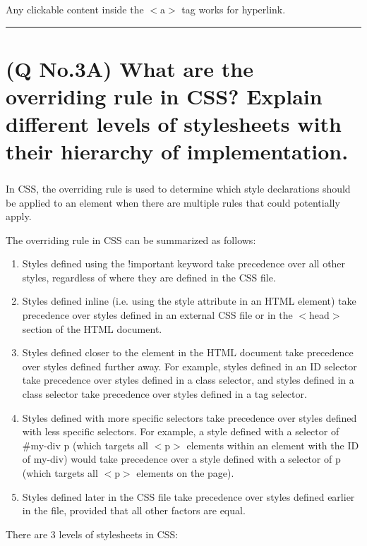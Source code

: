 \documentclass[11pt]{article}
\begin{document}
Any clickable content inside the $<$a$>$ tag works for hyperlink.

\noindent\rule{\linewidth}{0.4pt}
\section{(Q No.3A) What are the overriding rule in CSS? Explain different levels of stylesheets with their hierarchy of implementation.}
\subparagraph{}
In CSS, the overriding rule is used to determine which style declarations should be applied to an element when there are multiple rules that could potentially apply.

The overriding rule in CSS can be summarized as follows:

\begin{enumerate}
    \item Styles defined using the !important keyword take precedence over all other styles, regardless of where they are defined in the CSS file.

    \item Styles defined inline (i.e. using the style attribute in an HTML element) take precedence over styles defined in an external CSS file or in the $<$head$>$ section of the HTML document.
    
    \item Styles defined closer to the element in the HTML document take precedence over styles defined further away. For example, styles defined in an ID selector take precedence over styles defined in a class selector, and styles defined in a class selector take precedence over styles defined in a tag selector.
    
    \item Styles defined with more specific selectors take precedence over styles defined with less specific selectors. For example, a style defined with a selector of \#my-div p (which targets all $<$p$>$ elements within an element with the ID of my-div) would take precedence over a style defined with a selector of p (which targets all $<$p$>$ elements on the page).
    
    \item Styles defined later in the CSS file take precedence over styles defined earlier in the file, provided that all other factors are equal.
\end{enumerate}
There are 3 levels of stylesheets in CSS:
\end{document}
